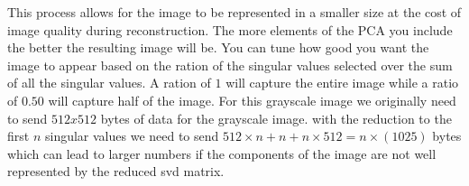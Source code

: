 \documentclass{article}
\begin{document}
This process allows for the image to be represented in a smaller size at the cost of image quality during reconstruction.
The more elements of the PCA you include the better the resulting image will be.
You can tune how good you want the image to appear based on the ration of the singular values selected over the sum of all the singular values.
A ration of $1$ will capture the entire image while a ratio of $0.50$ will capture half of the image.
For this grayscale image we originally need to send $512 x 512$ bytes of data for the grayscale image.
with the reduction to the first $n$ singular values we need to send $512 \times n + n + n \times 512 = n \times (1025)$ bytes which can lead to larger numbers if the components of the image are not well represented by the reduced svd matrix.
\end{document}
